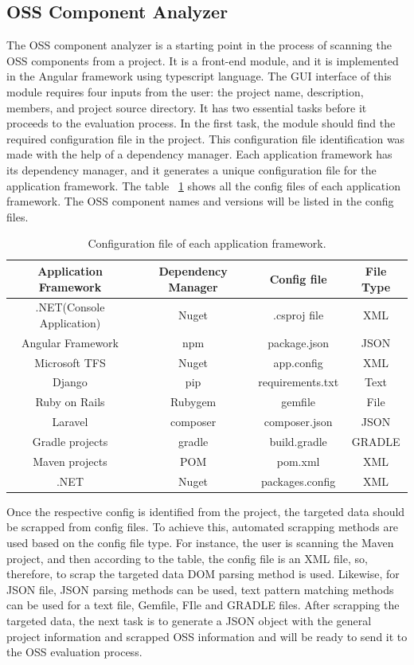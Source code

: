 \subsection{OSS Component Analyzer}
The \acs{OSS} component analyzer is a starting point in the process of scanning the \acs{OSS} components from a project. It is a front-end module, and it is implemented in the Angular framework using typescript language. The GUI interface of this module requires four inputs from the user: the project name, description, members, and project source directory. It has two essential tasks before it proceeds to the evaluation process. In the first task, the module should find the required configuration file in the project. This configuration file identification was made with the help of a dependency manager. Each application framework has its dependency manager, and it generates a unique configuration file for the application framework. The table ~\ref{tab:configFiles} shows all the config files of each application framework. The \acs{OSS} component names and versions will be listed in the config files.
\begin{table}[h!]
\begin{center}
 \begin{tabular}{ |c|c|c|c| } 
 	\hline
 	Application Framework & Dependency Manager & Config file & File Type \\
 	\hline
 	.NET(Console Application) & Nuget & .csproj file & XML \\ 
 	Angular Framework & npm & package.json & JSON \\ 
 	Microsoft TFS & Nuget & app.config & XML \\ 
 	Django & pip & requirements.txt & Text\\ 
 	Ruby on Rails & Rubygem & gemfile & File \\ 
 	Laravel & composer & composer.json & JSON \\ 
 	Gradle projects & gradle & build.gradle & GRADLE \\ 
 	Maven projects & POM & pom.xml & XML \\ 
 	.NET & Nuget & packages.config & XML \\ 
 	\hline
 \end{tabular}
\caption{Configuration file of each application framework.}\label{tab:configFiles}
\end{center} 
\end{table}

Once the respective config is identified from the project, the targeted data should be scrapped from config files. To achieve this, automated scrapping methods are used based on the config file type. For instance, the user is scanning the Maven project, and then according to the table, the config file is an XML file, so, therefore, to scrap the targeted data \acs{DOM} parsing method is used. Likewise, for \acs{JSON} file, JSON parsing methods can be used, text pattern matching methods can be used for a text file, Gemfile, FIle and GRADLE files. After scrapping the targeted data, the next task is to generate a JSON object with the general project information and scrapped \ac{OSS} information and will be ready to send it to the \acs{OSS} evaluation process. 

